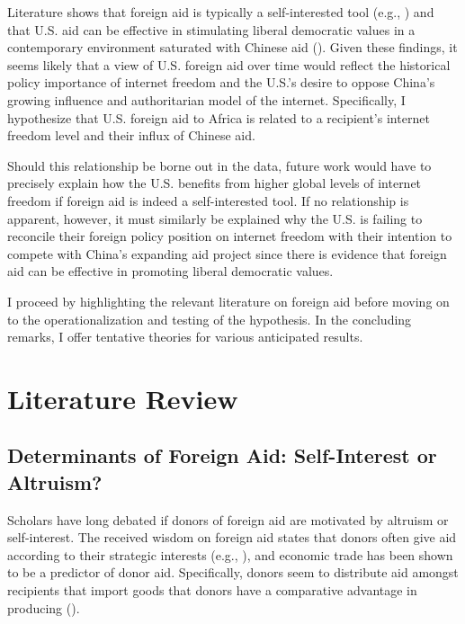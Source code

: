 \documentclass{article}
\begin{document}
Literature shows that foreign aid is typically a self-interested tool (e.g., \cite{hoeffler2011}) and that U.S. aid can be effective in stimulating liberal democratic values in a contemporary environment saturated with Chinese aid (\cite{blair2022}). Given these findings, it seems likely that a view of U.S. foreign aid over time would reflect the historical policy importance of internet freedom and the U.S.'s desire to oppose China's growing influence and authoritarian model of the internet. Specifically, I hypothesize that U.S. foreign aid to Africa is related to a recipient's internet freedom level and their influx of Chinese aid.

Should this relationship be borne out in the data, future work would have to precisely explain how the U.S. benefits from higher global levels of internet freedom if foreign aid is indeed a self-interested tool. If no relationship is apparent, however, it must similarly be explained why the U.S. is failing to reconcile their foreign policy position on internet freedom with their intention to compete with China's expanding aid project since there is evidence that foreign aid can be effective in promoting liberal democratic values.

I proceed by highlighting the relevant literature on foreign aid before moving on to the operationalization and testing of the hypothesis. In the concluding remarks, I offer tentative theories for various anticipated results.  

\section*{Literature Review} %
\subsection*{Determinants of Foreign Aid: Self-Interest or Altruism?}
Scholars have long debated if donors of foreign aid are motivated by altruism or self-interest. The received wisdom on foreign aid states that donors often give aid according to their strategic interests (e.g., \cite{mckinlay1977}), and economic trade has been shown to be a predictor of donor aid. Specifically, donors seem to distribute aid amongst recipients that import goods that donors have a comparative advantage in producing (\cite{younas2008}).
\end{document}

